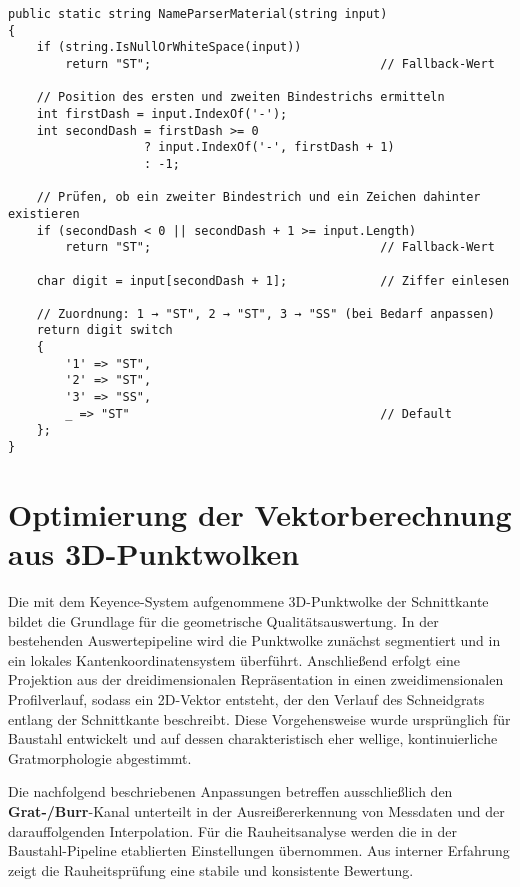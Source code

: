 \begin{lstlisting}[language={[Sharp]C}, caption={Werkstoffabhängiges Routing der Handscanner-Setups}, label={lst:messzellen-routing}]
public static string NameParserMaterial(string input)
{
    if (string.IsNullOrWhiteSpace(input))
        return "ST";                                // Fallback-Wert

    // Position des ersten und zweiten Bindestrichs ermitteln
    int firstDash = input.IndexOf('-');
    int secondDash = firstDash >= 0
                   ? input.IndexOf('-', firstDash + 1)
                   : -1;

    // Prüfen, ob ein zweiter Bindestrich und ein Zeichen dahinter existieren
    if (secondDash < 0 || secondDash + 1 >= input.Length)
        return "ST";                                // Fallback-Wert

    char digit = input[secondDash + 1];             // Ziffer einlesen

    // Zuordnung: 1 → "ST", 2 → "ST", 3 → "SS" (bei Bedarf anpassen)
    return digit switch
    {
        '1' => "ST",
        '2' => "ST",
        '3' => "SS",
        _ => "ST"                                   // Default
    };
}
\end{lstlisting}

\section{Optimierung der Vektorberechnung aus 3D-Punktwolken}
\label{chap:3d-punktwolken-optimierung}

Die mit dem Keyence-System aufgenommene 3D-Punktwolke der Schnittkante bildet die Grundlage für die geometrische Qualitätsauswertung. In der bestehenden Auswertepipeline wird die Punktwolke zunächst segmentiert und in ein lokales Kantenkoordinatensystem überführt. Anschließend erfolgt eine Projektion aus der dreidimensionalen Repräsentation in einen zweidimensionalen Profilverlauf, sodass ein 2D-Vektor entsteht, der den Verlauf des Schneidgrats entlang der Schnittkante beschreibt. Diese Vorgehensweise wurde ursprünglich für Baustahl entwickelt und auf dessen charakteristisch eher wellige, kontinuierliche Gratmorphologie abgestimmt.

Die nachfolgend beschriebenen Anpassungen betreffen ausschließlich den \textbf{Grat-/Burr}-Kanal unterteilt in der Ausreißererkennung von Messdaten und der darauffolgenden Interpolation. Für die Rauheitsanalyse werden die in der Baustahl-Pipeline etablierten Einstellungen übernommen. Aus interner Erfahrung zeigt die Rauheitsprüfung eine stabile und konsistente Bewertung.

